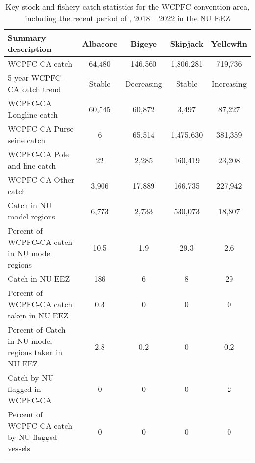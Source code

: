 \begin{longtable}{lcccc}
\caption{Key stock and fishery catch statistics for the WCPFC convention area, including the recent period of , 2018 -- 2022 in the NU EEZ} \\ 
  \hline
Summary description & Albacore & Bigeye & Skipjack & Yellowfin \\ 
  \hline
WCPFC-CA catch & 64,480 & 146,560 & 1,806,281 & 719,736 \\ 
  5-year WCPFC-CA catch trend & Stable & Decreasing & Stable & Increasing \\ 
  WCPFC-CA Longline catch & 60,545 & 60,872 & 3,497 & 87,227 \\ 
  WCPFC-CA Purse seine catch & 6 & 65,514 & 1,475,630 & 381,359 \\ 
  WCPFC-CA Pole and line catch & 22 & 2,285 & 160,419 & 23,208 \\ 
  WCPFC-CA Other catch & 3,906 & 17,889 & 166,735 & 227,942 \\ 
  Catch in NU model regions & 6,773 & 2,733 & 530,073 & 18,807 \\ 
  Percent of WCPFC-CA catch in NU model regions & 10.5 & 1.9 & 29.3 & 2.6 \\ 
   \hline
Catch in NU EEZ & 186 & 6 & 8 & 29 \\ 
  Percent of WCPFC-CA catch taken in NU EEZ & 0.3 & 0 & 0 & 0 \\ 
  Percent of Catch in NU model regions taken in NU EEZ & 2.8 & 0.2 & 0 & 0.2 \\ 
  Catch by NU flagged in WCPFC-CA & 0 & 0 & 0 & 2 \\ 
  Percent of WCPFC-CA catch by NU flagged vessels & 0 & 0 & 0 & 0 \\ 
  \hline
\label{cat_sum_tab}
\end{longtable}
